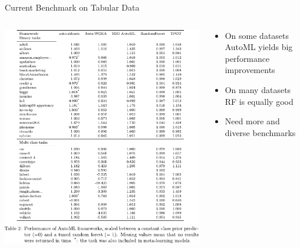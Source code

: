 	\begin{frame}[c]{Current Benchmark on Tabular Data }
		
		\begin{columns}
			\begin{column}{0.43\textwidth}
				
				\vspace{-0.7cm}
				\begin{center}
					\includegraphics[width = \textwidth]{images/gijsbers_open_2019_tab2.pdf}
				\end{center}
			
			\end{column}%
		
			\begin{column}{0.57\textwidth}
				
				\begin{itemize}
					\item On some datasets AutoML yields big performance improvements
					\item On many datasets RF is equally good
					\item Need more and diverse benchmarks
				\end{itemize}
				
			\end{column}
		\end{columns}
	\end{frame}
	
